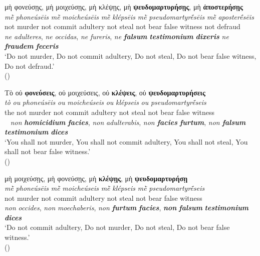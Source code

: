 \documentclass[output=paper,colorlinks,citecolor=brown]{langscibook}
\begin{document}
\gllll μὴ φονεύσῃς, μὴ μοιχεύσῃς, μὴ κλέψῃς, μὴ \textbf{ψευδομαρτυρήσῃς}, μὴ \textbf{ἀποστερήσῃς}\\
 \textit{mḕ} \textit{phoneúsēis} \textit{mḕ} \textit{moicheúsēis} \textit{mḕ} \textit{klépsēis} \textit{mḕ} \textit{pseudomartyrḗsēis} \textit{mḕ} \textit{aposterḗsēis}\\
not murder not {commit adultery} not steal not {bear false witness} not defraud\\
\emph{ne} \emph{adulteres}, \emph{ne} \emph{occidas}, \emph{ne} \emph{fureris}, \emph{ne} {\textbf{\itshape falsum} \textbf{\itshape testimonium} \textbf{\itshape dixeris}}
\emph{ne} {\textbf{\itshape fraudem} \textbf{\itshape feceris}}\\
\glt `Do not murder, Do not commit adultery, Do not steal, Do not bear false witness, Do not defraud.' \\
\hspace*{\fill}()

\ex\label{ex:bj:13b}

\gllll Τὸ οὐ \textbf{φονεύσεις}, οὐ μοιχεύσεις, οὐ \textbf{κλέψεις}, οὐ \textbf{ψευδομαρτυρήσεις}\\
 \textit{tò} \textit{ou} \textit{phoneúsēis} \textit{ou} \textit{moicheúseis} \textit{ou} \textit{klépseis} \textit{ou} \textit{pseudomartyrḗseis}\\
the not murder not {commit adultery} not steal not {bear false witness}\\
~ \emph{non} {\textbf{\itshape homicidium} \textbf{\itshape facies}}, \emph{non} \emph{adulterabis}, \emph{non} {\textbf{\itshape facies} \textbf{\itshape furtum}},
\emph{non} {\emph{\bfseries falsum} \textbf{\itshape testimonium} \textbf{\itshape dices}}\\
\glt `You shall not murder, You shall not commit adultery, You shall not steal, You shall not bear false witness.' \\
\hspace*{\fill}()

\ex\label{ex:bj:13c}

\gllll  μὴ μοιχεύσῃς, μὴ φονεύσῃς, μὴ \textbf{κλέψῃς}, μὴ \textbf{ψευδομαρτυρήσῃ}\\
 \textit{mḕ} \textit{phoneúsēis} \textit{mḕ} \textit{moicheúseis} \textit{mḕ} \textit{klépseis} \textit{mḕ} \textit{pseudomartyrḗseis}\\
not murder not {commit adultery} not steal not {bear false witness}\\
\emph{non} \emph{occides}, \emph{non} \emph{moechaberis}, \emph{non} {\textbf{\itshape furtum} \textbf{\itshape facies}}, \textbf{\itshape non} {\textbf{\itshape falsum}
  \textbf{\itshape testimonium} \textbf{\itshape dices}}\\
\glt `Do not commit adultery, Do not murder, Do not steal, Do not bear false witness.' \\
\hspace*{\fill}()
\end{document}
